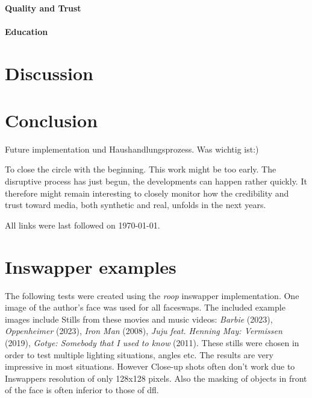 \documentclass[
  a4paper,  %
  twoside,  %
  bibliography=totoc,
  headsepline,
  cleardoublepage=empty,
  parskip=half,
  draft=false
]{scrbook}
\begin{document}
\subsubsection{Quality and Trust}

\subsubsection{Education}







\chapter{Discussion}

\chapter{Conclusion}
\label{sec:conclusion}

Future implementation und Haushandlungsprozess. Was wichtig ist:) 

To close the circle with the beginning. This work might be too early. The disruptive process has just begun, the developments can happen rather quickly. It therefore might remain interesting to closely monitor how the credibility and trust toward media, both synthetic and real, unfolds in the next years. 






\printbibliography
All links were last followed on \today{}.

\appendix
\chapter{Inswapper examples}
\label{chap:insightface-demos}
The following tests were created using the \textit{roop} inswapper implementation. One image of the author's face was used for all faceswaps. The included example images include Stills from these movies and music videos: \textit{Barbie} (2023), \textit{Oppenheimer} (2023), \textit{Iron Man} (2008), \textit{Juju feat. Henning May: Vermissen} (2019), \textit{Gotye: Somebody that I used to know} (2011).
These stills were chosen in order to test multiple lighting situations, angles etc. The results are very impressive in most situations. However Close-up shots often don't work due to Inswappers resolution of only 128x128 pixels. Also the masking of objects in front of the face is often inferior to those of \gls{dfl}.
\end{document}
